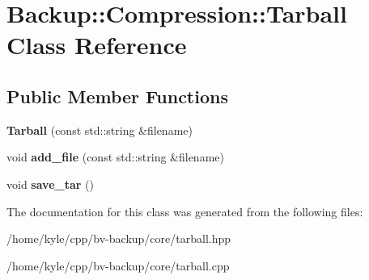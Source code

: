 \hypertarget{class_backup_1_1_compression_1_1_tarball}{}\section{Backup\+:\+:Compression\+:\+:Tarball Class Reference}
\label{class_backup_1_1_compression_1_1_tarball}
\subsection*{Public Member Functions}
\begin{DoxyCompactItemize}
\item 
\mbox{\label{class_backup_1_1_compression_1_1_tarball_ab71eebba7d98531f2fc9cf38be90a818}} 
{\bfseries Tarball} (const std\+::string \&filename)
\item 
\mbox{\label{class_backup_1_1_compression_1_1_tarball_a5aef35d53ea10193dc498a2b7cf7e823}} 
void {\bfseries add\+\_\+file} (const std\+::string \&filename)
\item 
\mbox{\label{class_backup_1_1_compression_1_1_tarball_a4eb904dd9b5a7977f9a4f470390b52d8}} 
void {\bfseries save\+\_\+tar} ()
\end{DoxyCompactItemize}


The documentation for this class was generated from the following files\+:\begin{DoxyCompactItemize}
\item 
/home/kyle/cpp/bv-\/backup/core/tarball.\+hpp\item 
/home/kyle/cpp/bv-\/backup/core/tarball.\+cpp\end{DoxyCompactItemize}
